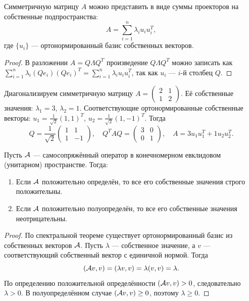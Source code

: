 \documentclass[10pt]{article}
\begin{document}
\begin{corollary}
    Симметричную матрицу $A$ можно представить в виде суммы проекторов на собственные подпространства:
    \[
    A = \sum_{i=1}^n \lambda_i u_i u_i^T,
    \]
    где $\{u_i\}$ — ортонормированный базис собственных векторов.
\end{corollary}
\begin{proof}
    В разложении $A = Q \Lambda Q^T$ произведение $Q \Lambda Q^T$ можно записать как $\sum_{i=1}^n \lambda_i (Q e_i)(Q e_i)^T = \sum_{i=1}^n \lambda_i u_i u_i^T$, так как $u_i$ — $i$-й столбец $Q$.
\end{proof}

\begin{example}
    Диагонализируем симметричную матрицу $A = \begin{pmatrix} 2 & 1 \\ 1 & 2 \end{pmatrix}$. Её собственные значения: $\lambda_1 = 3$, $\lambda_2 = 1$. Соответствующие ортонормированные собственные векторы: $u_1 = \frac{1}{\sqrt{2}}(1,1)^T$, $u_2 = \frac{1}{\sqrt{2}}(1,-1)^T$. Тогда
    \[
    Q = \frac{1}{\sqrt{2}}\begin{pmatrix} 1 & 1 \\ 1 & -1 \end{pmatrix},\quad Q^T A Q = \begin{pmatrix} 3 & 0 \\ 0 & 1 \end{pmatrix},\quad A = 3u_1u_1^T + 1u_2u_2^T.
    \]
\end{example}


\begin{theorem}
    Пусть $\mathcal{A}$ — самосопряжённый оператор в конечномерном евклидовом (унитарном) пространстве. Тогда:
    \begin{enumerate}
        \item Если $\mathcal{A}$ положительно определён, то все его собственные значения строго положительны.
        \item Если $\mathcal{A}$ положительно полуопределён, то все его собственные значения неотрицательны.
    \end{enumerate}
\end{theorem}

\begin{proof}
    По спектральной теореме существует ортонормированный базис из собственных векторов $\mathcal{A}$. Пусть $\lambda$ — собственное значение, а $v$ — соответствующий собственный вектор с единичной нормой. Тогда
    \[
    (\mathcal{A} v, v) = (\lambda v, v) = \lambda (v, v) = \lambda.
    \]
    По определению положительной определённости $(\mathcal{A} v, v) > 0$, следовательно $\lambda > 0$. В полуопределённом случае $(\mathcal{A} v, v) \ge 0$, поэтому $\lambda \ge 0$.
\end{proof}
\end{document}
